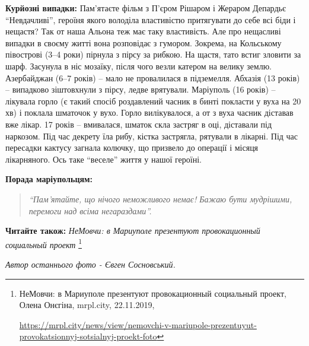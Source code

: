 \textbf{Курйозні випадки:} Пам'ятаєте фільм з П'єром Рішаром і Жераром Депардьє
\enquote{Невдачливі}, героїня якого володіла властивістю притягувати до себе всі біди і
нещастя? Так от наша Альона теж має таку властивість. Але про нещасливі випадки
в своєму житті вона розповідає з гумором. Зокрема, на Кольському півострові
(3–4 роки) пірнула з пірсу за рибкою. На щастя, тато встиг зловити за шарф.
Засунула в ніс мозаїку, після чого везли катером на велику землю. Азербайджан
(6–7 років) – мало не провалилася в підземелля. Абхазія (13 років) – випадково
зіштовхнули з пірсу, ледве врятували. Маріуполь (16 років) – лікувала горло (є
такий спосіб роздавлений часник в бинті покласти у вуха на 20 хв) і поклала
шматочок у вухо. Горло вилікувалося, а от з вуха часник діставав вже лікар. 17
років – вмивалася, шматок скла застряг в оці, діставали під наркозом. Під час
декрету їла рибу, кістка застрягла, рятували в лікарні. Під час пересадки
кактусу загнала колючку, що призвело до операції і місяця лікарняного. Ось таке
\enquote{веселе} життя у нашої героїні.

\textbf{Порада маріупольцям:} 

\begin{quote}
\em\enquote{Пам'ятайте, що нічого неможливого немає! Бажаю бути мудрішими, перемоги над
всіма негараздами}.
\end{quote}

\textbf{Читайте також:} \emph{НеМовчи: в Мариуполе презентуют провокационный социальный проект}%
\footnote{НеМовчи: в Мариуполе презентуют провокационный социальный проект, Олена Онєгіна, mrpl.city, 22.11.2019, \par%
\url{https://mrpl.city/news/view/nemovchi-v-mariupole-prezentuyut-provokatsionnyj-sotsialnyj-proekt-foto}
}

\emph{Автор останнього фото - Євген Сосновський.}
